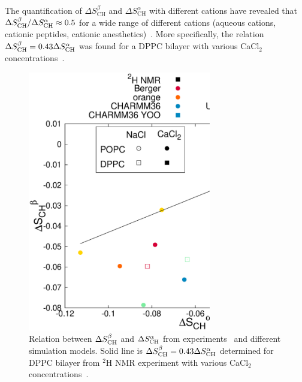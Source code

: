\documentclass[pre,aps,floatfix,authordate1-4,twocolumn]{revtex4-1}
\begin{document}
The quantification of $\Delta S_\mathrm{CH}^\beta$ and $\Delta S_\mathrm{CH}^\alpha$
with different cations
have revealed that $\Delta S_{\rm{CH}}^{\beta}/\Delta S_{\rm{CH}}^{\alpha} \approx0.5$ for a wide range
of different cations (aqueous cations, cationic peptides, cationic anesthetics)~\cite{beschiasvili91,rydall92}.
More specifically,
the relation $\Delta S_{\rm{CH}}^{\beta}=0.43 \Delta S_{\rm{CH}}^{\alpha}$ was found for a DPPC bilayer
with various CaCl$_2$ concentrations~\cite{akutsu81}.
\begin{figure}[]
  \centering
  \includegraphics[width=8cm]{../Fig/OrderParameterAvsB.eps}
  \caption{\label{AvsB}
    Relation between $\Delta S_{\rm{CH}}^{\beta}$ and $\Delta S_{\rm{CH}}^{\alpha}$ from experiments~\cite{akutsu81} and
    different simulation models. Solid line is $\Delta S_{\rm{CH}}^{\beta}=0.43\Delta S_{\rm{CH}}^{\alpha}$ determined for DPPC bilayer
    from $^2$H NMR experiment with various CaCl$_2$ concentrations~\cite{akutsu81}.
  }
\end{figure}
\end{document}
